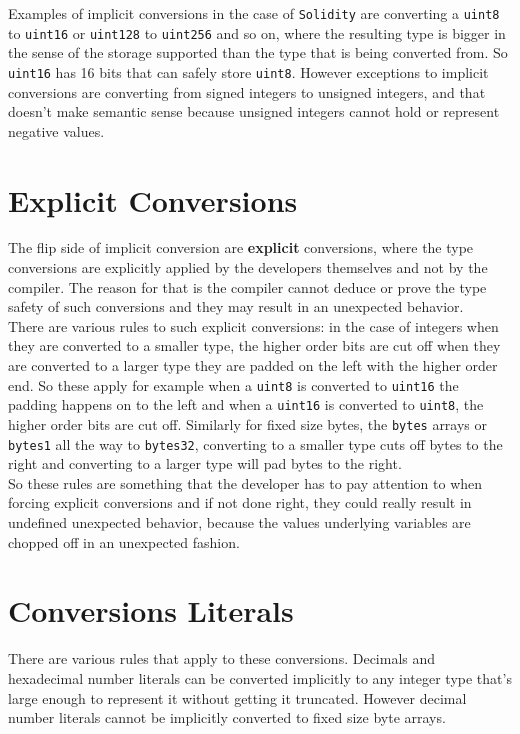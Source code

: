 Examples of implicit conversions in the case of \texttt{Solidity} are converting a \texttt{uint8} to \texttt{uint16} or \texttt{uint128} to \texttt{uint256} and so on, where the resulting type is bigger in the sense of the storage supported than the type that is being converted from. So \texttt{uint16} has 16 bits that can safely store \texttt{uint8}. However exceptions to implicit conversions are converting from signed integers to unsigned integers, and that doesn't make semantic sense because unsigned integers cannot hold or represent negative values.

\section{Explicit Conversions}
The flip side of implicit conversion are \textbf{explicit} conversions, where the type conversions are explicitly applied by the developers themselves and not by the compiler. The reason for that is the compiler cannot deduce or prove the type safety of such conversions and they may result in an unexpected behavior.\\ 

There are various rules to such explicit conversions: in the case of integers when they are converted to a smaller type, the higher order bits are cut off when they are converted to a larger type they are padded on the left with the higher order end. So these apply for example when a \texttt{uint8} is converted to \texttt{uint16} the padding happens on to the left and when a \texttt{uint16} is converted to \texttt{uint8}, the higher order bits are cut off. Similarly for fixed size bytes, the \texttt{bytes} arrays or \texttt{bytes1} all the way to \texttt{bytes32}, converting to a smaller type cuts off bytes to the right and converting to a larger type will pad bytes to the right.\\

So these rules are something that the developer has to pay attention to when forcing explicit conversions and if not done right, they could really result in undefined unexpected behavior, because the values underlying variables are chopped off in an unexpected fashion.

\section{Conversions Literals}
There are various rules that apply to these conversions. Decimals and hexadecimal number literals can be converted implicitly to any integer type that's large enough to represent it without getting it truncated. However decimal number literals cannot be implicitly converted to fixed size byte arrays.\\ 

